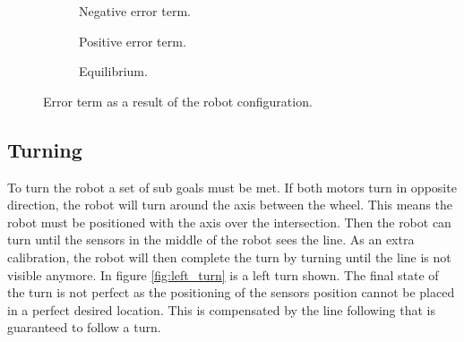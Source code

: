 \begin{figure}[H]
 \begin{subfigure}{0.32\textwidth}
 \centering
  \caption{Negative error term.}
 \end{subfigure}
 \begin{subfigure}{0.32\textwidth}
 \centering
  \caption{Positive error term.}
 \end{subfigure}
 \begin{subfigure}{0.32\textwidth}
 \centering
  \caption{Equilibrium.}
 \end{subfigure}
\caption{Error term as a result of the robot configuration.}
\label{fig:line_follow}
\end{figure}


\subsection{Turning}
To turn the robot a set of sub goals must be met.
If both motors turn in opposite direction, the robot will turn around the axis between the wheel.
This means the robot must be positioned with the axis over the intersection.
Then the robot can turn until the sensors in the middle of the robot sees the line.
As an extra calibration, the robot will then complete the turn by turning until the line is not visible anymore.
In figure \ref{fig:left_turn} is a left turn shown.
The final state of the turn is not perfect as the positioning of the sensors position cannot be placed in a perfect desired location.
This is compensated by the line following that is guaranteed to follow a turn.

